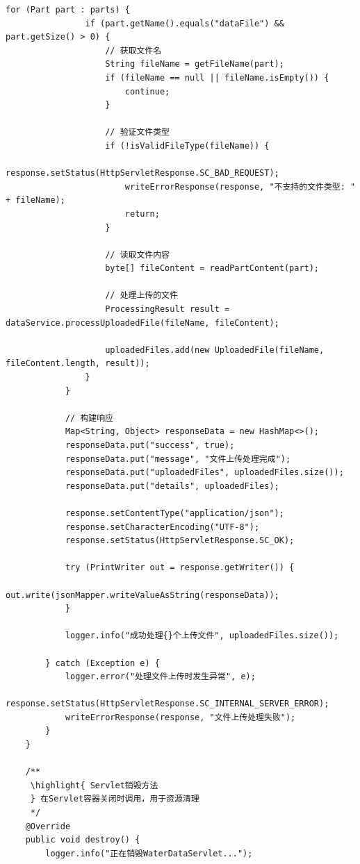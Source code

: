 \begin{lstlisting}[style=java]
            for (Part part : parts) {
                if (part.getName().equals("dataFile") && part.getSize() > 0) {
                    // 获取文件名
                    String fileName = getFileName(part);
                    if (fileName == null || fileName.isEmpty()) {
                        continue;
                    }
                    
                    // 验证文件类型
                    if (!isValidFileType(fileName)) {
                        response.setStatus(HttpServletResponse.SC_BAD_REQUEST);
                        writeErrorResponse(response, "不支持的文件类型: " + fileName);
                        return;
                    }
                    
                    // 读取文件内容
                    byte[] fileContent = readPartContent(part);
                    
                    // 处理上传的文件
                    ProcessingResult result = dataService.processUploadedFile(fileName, fileContent);
                    
                    uploadedFiles.add(new UploadedFile(fileName, fileContent.length, result));
                }
            }
            
            // 构建响应
            Map<String, Object> responseData = new HashMap<>();
            responseData.put("success", true);
            responseData.put("message", "文件上传处理完成");
            responseData.put("uploadedFiles", uploadedFiles.size());
            responseData.put("details", uploadedFiles);
            
            response.setContentType("application/json");
            response.setCharacterEncoding("UTF-8");
            response.setStatus(HttpServletResponse.SC_OK);
            
            try (PrintWriter out = response.getWriter()) {
                out.write(jsonMapper.writeValueAsString(responseData));
            }
            
            logger.info("成功处理{}个上传文件", uploadedFiles.size());
            
        } catch (Exception e) {
            logger.error("处理文件上传时发生异常", e);
            response.setStatus(HttpServletResponse.SC_INTERNAL_SERVER_ERROR);
            writeErrorResponse(response, "文件上传处理失败");
        }
    }
    
    /**
     \highlight{ Servlet销毁方法
     } 在Servlet容器关闭时调用，用于资源清理
     */
    @Override
    public void destroy() {
        logger.info("正在销毁WaterDataServlet...");
        

\end{lstlisting}
